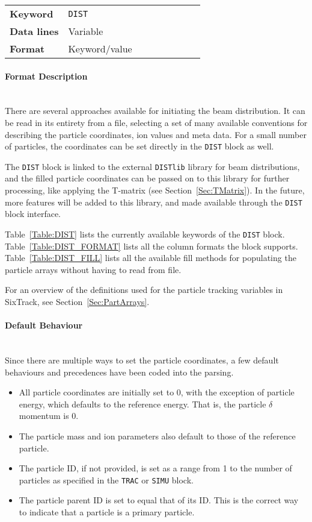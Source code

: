 \bigskip
\begin{tabular}{@{}lp{0.7\linewidth}}
    \textbf{Keyword}    & \texttt{DIST}\index{DIST} \\
    \textbf{Data lines} & Variable \\
    \textbf{Format}     & Keyword/value
\end{tabular}

\paragraph{Format Description}~\\

There are several approaches available for initiating the beam distribution.
It can be read in its entirety from a file, selecting a set of many available conventions for describing the particle coordinates, ion values and meta data.
For a small number of particles, the coordinates can be set directly in the \texttt{DIST} block as well.

The \texttt{DIST} block is linked to the external \texttt{DISTlib} library for beam distributions, and the filled particle coordinates can be passed on to this library for further processing, like applying the T-matrix (see Section~\ref{Sec:TMatrix}).
In the future, more features will be added to this library, and made available through the \texttt{DIST} block interface.

Table~\ref{Table:DIST} lists the currently available keywords of the \texttt{DIST} block.
Table~\ref{Table:DIST_FORMAT} lists all the column formats the block supports.
Table~\ref{Table:DIST_FILL} lists all the available fill methods for populating the particle arrays without having to read from file.

For an overview of the definitions used for the particle tracking variables in SixTrack, see Section~\ref{Sec:PartArrays}.

\paragraph{Default Behaviour}~\\

Since there are multiple ways to set the particle coordinates, a few default behaviours and precedences have been coded into the parsing.

\begin{itemize}
    \item All particle coordinates are initially set to 0, with the exception of particle energy, which defaults to the reference energy. That is, the particle $\delta$ momentum is 0.
    \item The particle mass and ion parameters also default to those of the reference particle.
    \item The particle ID, if not provided, is set as a range from 1 to the number of particles as specified in the \texttt{TRAC} or \texttt{SIMU} block.
    \item The particle parent ID is set to equal that of its ID. This is the correct way to indicate that a particle is a primary particle.
\end{itemize}

